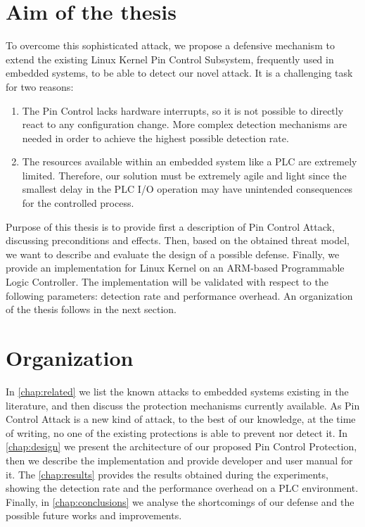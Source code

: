 \section{Aim of the thesis}

To overcome this sophisticated attack, we propose a defensive mechanism to extend the existing Linux Kernel Pin Control Subsystem, frequently used in embedded systems,
to be able to detect our novel attack. It is a challenging task for two reasons:
\begin{enumerate}
	\item The Pin Control lacks hardware interrupts, so it is not possible to directly react to any configuration change. More complex detection mechanisms are needed
		in order to achieve the highest possible detection rate.
	\item The resources available within an embedded system like a PLC are extremely limited. Therefore, our solution must be extremely agile and light
		since the smallest delay in the PLC I/O operation may have unintended consequences for the controlled process.
\end{enumerate}

Purpose of this thesis is to provide first a description of Pin Control Attack, discussing preconditions and effects.
Then, based on the obtained threat model, we want to describe and evaluate the design of a possible defense.
Finally, we provide an implementation for Linux Kernel on an ARM-based Programmable Logic Controller.
The implementation will be validated with respect to the following parameters: detection rate and performance overhead.
An organization of the thesis follows in the next section.


\section{Organization}

In \chap \ref{chap:related} we list the known attacks to embedded systems existing in the literature, and then discuss the protection mechanisms currently available.
As Pin Control Attack is a new kind of attack, to the best of our knowledge, at the time of writing, no one of the existing protections is able to prevent nor detect it.
In \chap \ref{chap:design} we present the architecture of our proposed Pin Control Protection, then we describe the implementation and provide developer and user manual for it.
The \chap \ref{chap:results} provides the results obtained during the experiments, showing the detection rate and the performance overhead on a PLC environment.
Finally, in \chap \ref{chap:conclusions} we analyse the shortcomings of our defense and the possible future works and improvements.
